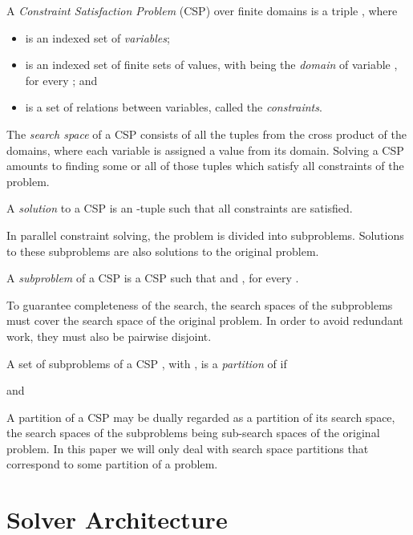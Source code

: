 \documentclass{llncs}
\begin{document}
\begin{definition}[CSP]
  A \emph{Constraint Satisfaction Problem} (CSP) over finite domains
  is a triple , where
  \begin{itemize}
  \item  is an indexed set of
    \emph{variables};
  \item  is an indexed set of finite
    sets of values, with  being the \emph{domain} of variable
    , for every ; and
  \item  is a set of relations between
    variables, called the \emph{constraints}.
  \end{itemize}
\end{definition}

The \emph{search space} of a CSP consists of all the tuples from the
cross product of the domains, where each variable is assigned a value
from its domain. Solving a CSP amounts to finding some or all of those
tuples which satisfy all constraints of the problem.

\begin{definition}[Solution]
  A \emph{solution} to a CSP is an -tuple  such that all constraints
  are satisfied.
\end{definition}

In parallel constraint solving, the problem is divided into
subproblems. Solutions to these subproblems are also solutions to the
original problem.

\begin{definition}[Subproblem]
  A \emph{subproblem} of a CSP  is a CSP 
  such that  and , for every .
\end{definition}

To guarantee completeness of the search, the search spaces of the
subproblems must cover the search space of the original problem. In
order to avoid redundant work, they must also be pairwise disjoint.

\begin{definition}[Partition]
  A set  of subproblems of a CSP ,
  with , is a
  \emph{partition} of  if
  
  and 
\end{definition}

A partition of a CSP may be dually regarded as a partition of its
search space, the search spaces of the subproblems being sub-search
spaces of the original problem. In this paper we will only deal with
search space partitions that correspond to some partition of a
problem.


\section{Solver Architecture}
\label{sec:solver}
\end{document}
